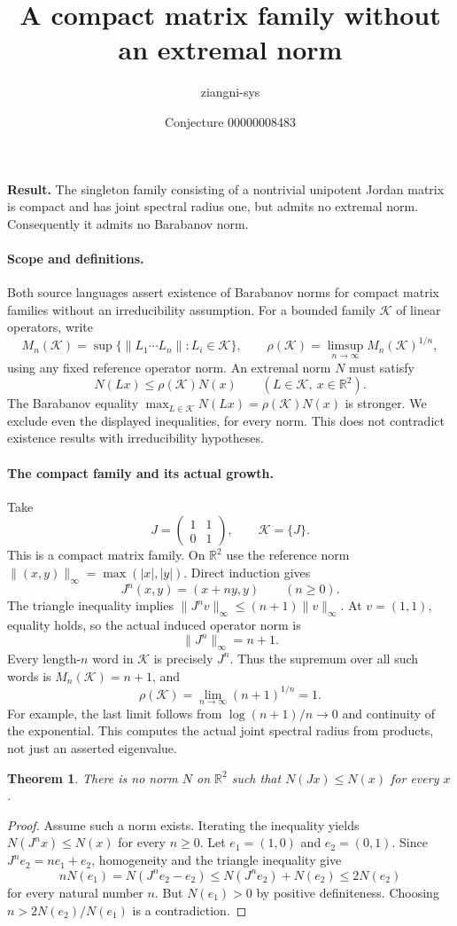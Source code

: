 \documentclass[11pt]{article}
\title{A compact matrix family without an extremal norm}
\author{ziangni-sys}
\date{Conjecture 00000008483}
\newtheorem{theorem}{Theorem}
\begin{document}
\raggedright
\maketitle
\noindent\textbf{Result.} The singleton family consisting of a nontrivial unipotent Jordan matrix is compact and has joint spectral radius one, but admits no extremal norm. Consequently it admits no Barabanov norm.

\paragraph{Scope and definitions.}
Both source languages assert existence of Barabanov norms for compact matrix families without an irreducibility assumption. For a bounded family $\mathcal K$ of linear operators, write
\[
M_n(\mathcal K)=\sup\{\|L_1\cdots L_n\|:L_i\in\mathcal K\},
\qquad
\rho(\mathcal K)=\limsup_{n\to\infty}M_n(\mathcal K)^{1/n},
\]
using any fixed reference operator norm. An extremal norm $N$ must satisfy
\[
N(Lx)\leq\rho(\mathcal K)N(x)\qquad(L\in\mathcal K,\ x\in\mathbb R^2).
\]
The Barabanov equality $\max_{L\in\mathcal K}N(Lx)=\rho(\mathcal K)N(x)$ is stronger. We exclude even the displayed inequalities, for every norm. This does not contradict existence results with irreducibility hypotheses.

\paragraph{The compact family and its actual growth.}
Take
\[
J=\begin{pmatrix}1&1\\0&1\end{pmatrix},\qquad \mathcal K=\{J\}.
\]
This is a compact matrix family. On $\mathbb R^2$ use the reference norm $\|(x,y)\|_\infty=\max(|x|,|y|)$. Direct induction gives
\[
J^n(x,y)=(x+ny,y)\qquad(n\geq0).
\]
The triangle inequality implies $\|J^nv\|_\infty\leq(n+1)\|v\|_\infty$. At $v=(1,1)$, equality holds, so the actual induced operator norm is
\[
\|J^n\|_\infty=n+1.
\]
Every length-$n$ word in $\mathcal K$ is precisely $J^n$. Thus the supremum over all such words is $M_n(\mathcal K)=n+1$, and
\[
\rho(\mathcal K)=\lim_{n\to\infty}(n+1)^{1/n}=1.
\]
For example, the last limit follows from $\log(n+1)/n\to0$ and continuity of the exponential. This computes the actual joint spectral radius from products, not just an asserted eigenvalue.

\newpage
\begin{theorem}
There is no norm $N$ on $\mathbb R^2$ such that $N(Jx)\leq N(x)$ for every $x$.
\end{theorem}
\begin{proof}
Assume such a norm exists. Iterating the inequality yields $N(J^nx)\leq N(x)$ for every $n\geq0$. Let $e_1=(1,0)$ and $e_2=(0,1)$. Since $J^ne_2=ne_1+e_2$, homogeneity and the triangle inequality give
\[
nN(e_1)=N(J^ne_2-e_2)
\leq N(J^ne_2)+N(e_2)\leq2N(e_2)
\]
for every natural number $n$. But $N(e_1)>0$ by positive definiteness. Choosing $n>2N(e_2)/N(e_1)$ is a contradiction.
\end{proof}
\end{document}
